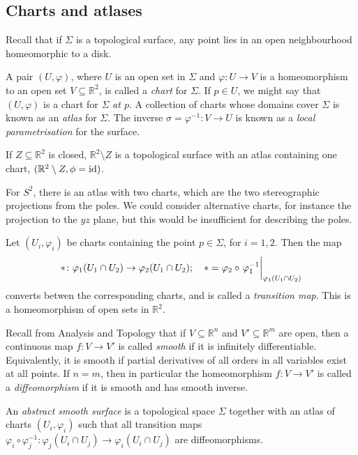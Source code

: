 \subsection{Charts and atlases}
Recall that if \( \Sigma \) is a topological surface, any point lies in an open neighbourhood homeomorphic to a disk.
\begin{definition}
	A pair \( (U, \varphi) \), where \( U \) is an open set in \( \Sigma \) and \( \varphi \colon U \to V \) is a homeomorphism to an open set \( V \subseteq \mathbb R^2 \), is called a \textit{chart} for \( \Sigma \).
	If \( p \in U \), we might say that \( (U, \varphi) \) is a chart for \( \Sigma \) \textit{at \( p \)}.
	A collection of charts whose domains cover \( \Sigma \) is known as an \textit{atlas} for \( \Sigma \).
	The inverse \( \sigma = \varphi^{-1} \colon V \to U \) is known as a \textit{local parametrisation} for the surface.
\end{definition}
\begin{example}
	If \( Z \subseteq \mathbb R^2 \) is closed, \( \mathbb R^2 \setminus Z \) is a topological surface with an atlas containing one chart, \( (\mathbb R^2 \setminus Z, \phi = \operatorname{id}) \).

	For \( S^2 \), there is an atlas with two charts, which are the two stereographic projections from the poles.
	We could consider alternative charts, for instance the projection to the \( yz \) plane, but this would be insufficient for describing the poles.
\end{example}
\begin{definition}
	Let \( (U_i, \varphi_i) \) be charts containing the point \( p \in \Sigma \), for \( i = 1, 2 \).
	Then the map
	\[ \ast \colon \varphi_1(U_1 \cap U_2) \to \varphi_2(U_1 \cap U_2);\quad \ast = \varphi_2 \circ \eval{\varphi_1^{-1}}_{\varphi_1(U_1 \cap U_2)} \]
	converts betwen the corresponding charts, and is called a \textit{transition map}.
	This is a homeomorphism of open sets in \( \mathbb R^2 \).
\end{definition}
Recall from Analysis and Topology that if \( V \subseteq \mathbb R^n \) and \( V' \subseteq \mathbb R^m \) are open, then a continuous map \( f \colon V \to V' \) is called \textit{smooth} if it is infinitely differentiable.
Equivalently, it is smooth if partial derivatives of all orders in all variables exist at all points.
If \( n = m \), then in particular the homeomorphism \( f \colon V \to V' \) is called a \textit{diffeomorphism} if it is smooth and has smooth inverse.
\begin{definition}
	An \textit{abstract smooth surface} is a topological space \( \Sigma \) together with an atlas of charts \( (U_i, \varphi_i) \) such that all transition maps \( \varphi_i \circ \varphi_j^{-1} \colon \varphi_j(U_i \cap U_j) \to \varphi_i(U_i \cap U_j) \) are diffeomorphisms.
\end{definition}
